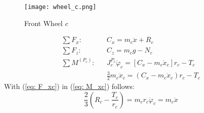 \begin{multicols}{2}
	\begin{figure}[H]
		\begin{center}
			\texttt{[image: wheel\_c.png]}
		\end{center}
		\caption{Front Wheel $c$}
	\end{figure}
	\begin{align} \label{eq: F_xc}
     	\sum F_x:&& C_x = m_c\ddot x+R_c\\ \label{eq: F_zc}
    	\sum F_z: && C_z = m_c g - N_c \\ \nonumber
	    \sum M^{\left(P_c\right)}: &&
    	J_c^{P_c}\ddot\varphi_c = \left[C_x-m_c\ddot x_c \right]r_c-T_c\\ \label{eq: M_xc}
    	&& \frac{3}{2}m_c\ddot x_c = (C_x-m_c\ddot x_c)r_c - T_c
	\end{align}
	With (\ref{eq: F_xc}) in (\ref{eq: M_xc}) follows: %
	\begin{equation}
	    \frac{2}{3}\left(R_c - \frac{T_c}{r_c} \right) = m_c r_c\ddot \varphi_c = m_c\ddot x
    	\label{eq: m2x2}
	\end{equation}
\end{multicols}

